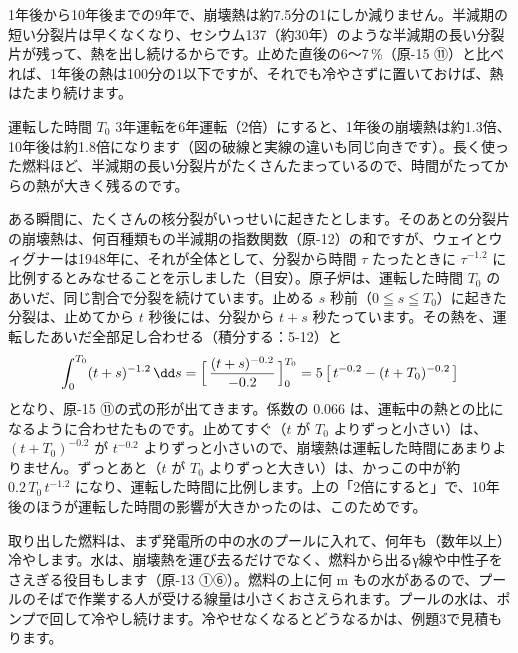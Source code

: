 \begin{phyomi}[{$P/P_0\approx0.066\,[t^{-0.2}-(t+T_0)^{-0.2}]$}]
1年後から10年後までの9年で、崩壊熱は約7.5分の1にしか減りません。半減期の短い分裂片は早くなくなり、セシウム137（約30年）のような半減期の長い分裂片が残って、熱を出し続けるからです。止めた直後の6〜7\,\%（原-15 ⑪）と比べれば、1年後の熱は100分の1以下ですが、それでも冷やさずに置いておけば、熱はたまり続けます。
\end{phyomi}

\begin{phbaisuru}{運転した時間 $T_0$}
3年運転を6年運転（2倍）にすると、1年後の崩壊熱は約1.3倍、10年後は約1.8倍になります（図の破線と実線の違いも同じ向きです）。長く使った燃料ほど、半減期の長い分裂片がたくさんたまっているので、時間がたってからの熱が大きく残るのです。
\end{phbaisuru}

\begin{motto}[4]
ある瞬間に、たくさんの核分裂がいっせいに起きたとします。そのあとの分裂片の崩壊熱は、何百種類もの半減期の指数関数（原-12）の和ですが、ウェイとウィグナーは1948年に、それが全体として、分裂から時間 $\tau$ たったときに $\tau^{-1.2}$ に比例するとみなせることを示しました（目安）。原子炉は、運転した時間 $T_0$ のあいだ、同じ割合で分裂を続けています。止める $s$ 秒前（$0\leqq s\leqq T_0$）に起きた分裂は、止めてから $t$ 秒後には、分裂から $t+s$ 秒たっています。その熱を、運転したあいだ全部足し合わせる（積分する：5-12）と
\[ \int_0^{T_0}(t+s)^{-1.2}\,\dd s=\Bigl[\,\frac{(t+s)^{-0.2}}{-0.2}\,\Bigr]_0^{T_0}=5\left[\,t^{-0.2}-(t+T_0)^{-0.2}\,\right] \]
となり、原-15 ⑪の式の形が出てきます。係数の 0.066 は、運転中の熱との比になるように合わせたものです。止めてすぐ（$t$ が $T_0$ よりずっと小さい）は、$(t+T_0)^{-0.2}$ が $t^{-0.2}$ よりずっと小さいので、崩壊熱は運転した時間にあまりよりません。ずっとあと（$t$ が $T_0$ よりずっと大きい）は、かっこの中が約 $0.2\,T_0\,t^{-1.2}$ になり、運転した時間に比例します。上の「2倍にすると」で、10年後のほうが運転した時間の影響が大きかったのは、このためです。
\end{motto}

取り出した燃料は、まず発電所の中の水のプールに入れて、何年も（数年以上）冷やします。水は、崩壊熱を運び去るだけでなく、燃料から出るγ線や中性子をさえぎる役目もします（原-13 ①⑥）。燃料の上に何 m もの水があるので、プールのそばで作業する人が受ける線量は小さくおさえられます。プールの水は、ポンプで回して冷やし続けます。冷やせなくなるとどうなるかは、例題3で見積もります。

